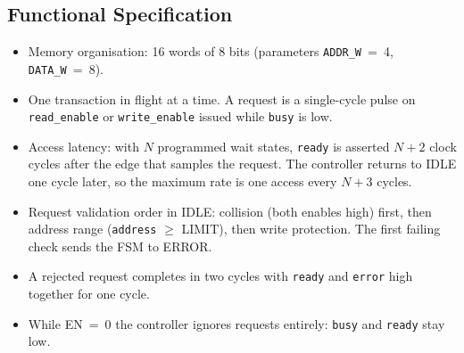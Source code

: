 \documentclass[11pt,a4paper]{article}
\newcommand{\sig}[1]{\texttt{#1}}
\begin{document}
\subsection{Functional Specification}
\begin{itemize}[leftmargin=*,itemsep=2pt]
\item Memory organisation: 16 words of 8 bits (parameters \sig{ADDR\_W}~=~4, \sig{DATA\_W}~=~8).
\item One transaction in flight at a time. A request is a single-cycle pulse on \sig{read\_enable} or \sig{write\_enable} issued while \sig{busy} is low.
\item Access latency: with $N$ programmed wait states, \sig{ready} is asserted $N+2$ clock cycles after the edge that samples the request. The controller returns to IDLE one cycle later, so the maximum rate is one access every $N+3$ cycles.
\item Request validation order in IDLE: collision (both enables high) first, then address range (\sig{address} $\geq$ LIMIT), then write protection. The first failing check sends the FSM to ERROR.
\item A rejected request completes in two cycles with \sig{ready} and \sig{error} high together for one cycle.
\item While EN~=~0 the controller ignores requests entirely: \sig{busy} and \sig{ready} stay low.
\end{itemize}
\end{document}
